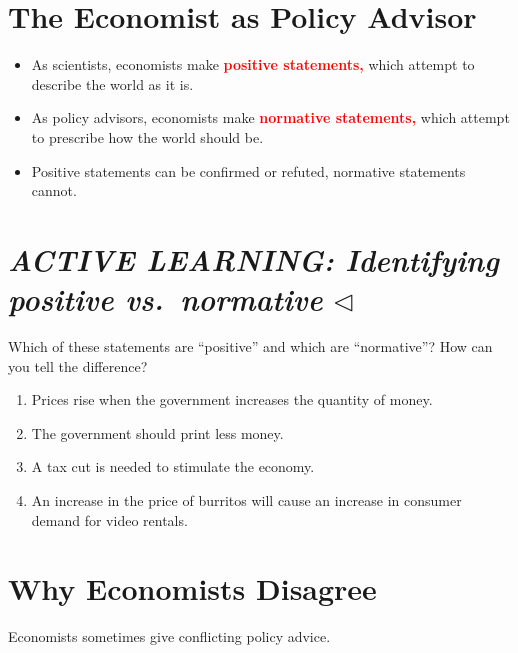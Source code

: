 \documentclass[
]{book}
\begin{document}
\hypertarget{the-economist-as-policy-advisor}{%
\section{The Economist as Policy Advisor}\label{the-economist-as-policy-advisor}}

\begin{itemize}
\item
  As scientists, economists make \textcolor{red}{\textbf{positive statements,}} which attempt to describe the world as it is.
\item
  As policy advisors, economists make \textcolor{red}{\textbf{normative statements,}} which attempt to prescribe how the world should be.
\item
  Positive statements can be confirmed or refuted, normative statements cannot.
\end{itemize}

\hypertarget{active-learning-identifying-positive-vs.-normative-triangleleft}{%
\section{\texorpdfstring{\textbf{\emph{ACTIVE LEARNING: Identifying positive vs.~normative}} \(\triangleleft\)}{ACTIVE LEARNING: Identifying positive vs.~normative \textbackslash triangleleft}}\label{active-learning-identifying-positive-vs.-normative-triangleleft}}

Which of these statements are ``positive'' and which are ``normative''? How can you tell the difference?

\begin{enumerate}
\def\labelenumi{\alph{enumi}.}
\item
  Prices rise when the government increases the quantity of money.
\item
  The government should print less money.
\item
  A tax cut is needed to stimulate the economy.
\item
  An increase in the price of burritos will cause an increase in consumer demand for video rentals.
\end{enumerate}

\hypertarget{why-economists-disagree}{%
\section{Why Economists Disagree}\label{why-economists-disagree}}

Economists sometimes give conflicting policy advice.
\end{document}
